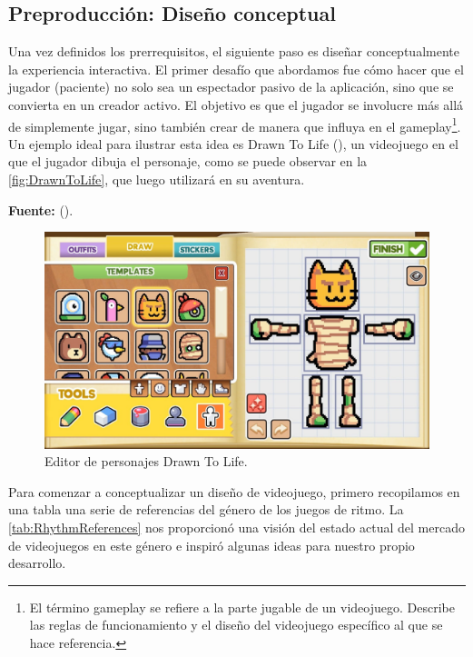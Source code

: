 \subsection{Preproducción: Diseño conceptual}

Una vez definidos los prerrequisitos, el siguiente paso es diseñar conceptualmente la experiencia interactiva. El primer desafío que abordamos fue cómo hacer que el jugador (paciente) no solo sea un espectador pasivo de la aplicación, sino que se convierta en un creador activo. El objetivo es que el jugador se involucre más allá de simplemente jugar, sino también crear de manera que influya en el gameplay\footnote{El término gameplay se refiere a la parte jugable de un videojuego. Describe las reglas de funcionamiento y el diseño del videojuego específico al que se hace referencia.}. Un ejemplo ideal para ilustrar esta idea es Drawn To Life (\cite{DTL:2007}), un videojuego en el que el jugador dibuja el personaje, como se puede observar en la \autoref{fig:DrawnToLife}, que luego utilizará en su aventura.

\begin{center}
	\textbf{Fuente:} \citeauthor{DTL:2020} (\citeyear{DTL:2020}).
	\vspace{-16pt}
\end{center}

\begin{figure}[h!]
	\centering
	\includegraphics[width=0.7\linewidth]{Figuras/Desarrollo/DrawnToLife.jpg}
	\caption{Editor de personajes Drawn To Life.}
	\label{fig:DrawnToLife}
\end{figure}

Para comenzar a conceptualizar un diseño de videojuego, primero recopilamos en una tabla una serie de referencias del género de los juegos de ritmo. La \autoref{tab:RhythmReferences} nos proporcionó una visión del estado actual del mercado de videojuegos en este género e inspiró algunas ideas para nuestro propio desarrollo.

